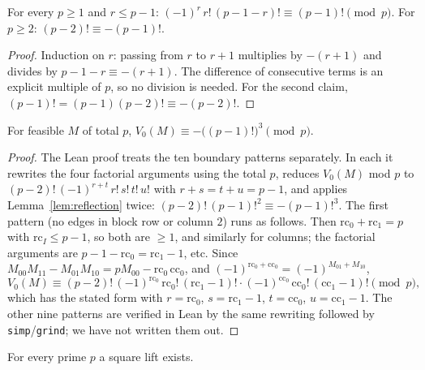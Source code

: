 \begin{lemma}\label{lem:reflection}
For every $p\ge1$ and $r\le p-1$:
$(-1)^r\,r!\,(p-1-r)!\equiv(p-1)!\pmod p$.  For $p\ge2$:
$(p-2)!\equiv-(p-1)!$.
\end{lemma}

\begin{proof}
Induction on $r$: passing from $r$ to $r+1$ multiplies by $-(r+1)$ and divides by
$p-1-r\equiv-(r+1)$.  The difference of consecutive terms is an explicit multiple
of $p$, so no division is needed.  For the second claim,
$(p-1)!=(p-1)(p-2)!\equiv-(p-2)!$.
\end{proof}

\begin{proposition}\label{prop:B-cong}
For feasible $M$ of total $p$, $V_0(M)\equiv-\bigl((p-1)!\bigr)^3\pmod p$.
\end{proposition}

\begin{proof}
The Lean proof treats the ten boundary patterns separately.  In each it rewrites
the four factorial arguments using the total $p$, reduces $V_0(M)$ mod $p$ to
$(p-2)!\,(-1)^{r+t}\,r!\,s!\,t!\,u!$ with $r+s=t+u=p-1$, and applies
Lemma~\ref{lem:reflection} twice:
$(p-2)!\,(p-1)!^2\equiv-(p-1)!^3$.  The first pattern (no edges in block row or
column $2$) runs as follows.  Then $\mathrm{rc}_0+\mathrm{rc}_1=p$ with
$\mathrm{rc}_I\le p-1$, so both are $\ge1$, and similarly for columns; the
factorial arguments are $p-1-\mathrm{rc}_0=\mathrm{rc}_1-1$, etc.  Since
$M_{00}M_{11}-M_{01}M_{10}=pM_{00}-\mathrm{rc}_0\,\mathrm{cc}_0$, and
$(-1)^{\mathrm{rc}_0+\mathrm{cc}_0}=(-1)^{M_{01}+M_{10}}$,
\[
V_0(M)\equiv(p-2)!\,(-1)^{\mathrm{rc}_0}\,\mathrm{rc}_0!\,(\mathrm{rc}_1-1)!\cdot
(-1)^{\mathrm{cc}_0}\,\mathrm{cc}_0!\,(\mathrm{cc}_1-1)!\pmod p,
\]
which has the stated form with $r=\mathrm{rc}_0$, $s=\mathrm{rc}_1-1$,
$t=\mathrm{cc}_0$, $u=\mathrm{cc}_1-1$.  The other nine patterns are verified in
Lean by the same rewriting followed by \texttt{simp}/\texttt{grind}; we have not
written them out.
\end{proof}

\begin{theorem}\label{thm:square-lift}
For every prime $p$ a square lift exists.
\end{theorem}

